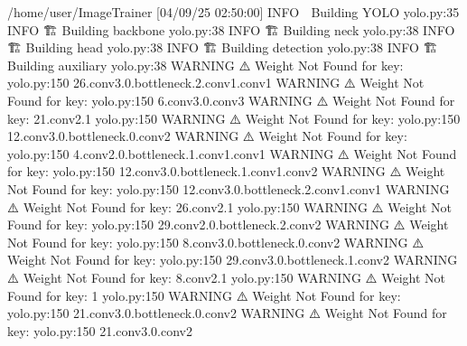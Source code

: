 /home/user/ImageTrainer
[04/09/25 02:50:00] INFO     🚜 Building YOLO                           yolo.py:35
                    INFO       🏗  Building backbone                     yolo.py:38
                    INFO       🏗  Building neck                         yolo.py:38
                    INFO       🏗  Building head                         yolo.py:38
                    INFO       🏗  Building detection                    yolo.py:38
                    INFO       🏗  Building auxiliary                    yolo.py:38
                    WARNING  ⚠ Weight Not Found for key:               yolo.py:150
                             26.conv3.0.bottleneck.2.conv1.conv1                  
                    WARNING  ⚠ Weight Not Found for key:               yolo.py:150
                             6.conv3.0.conv3                                      
                    WARNING  ⚠ Weight Not Found for key: 21.conv2.1    yolo.py:150
                    WARNING  ⚠ Weight Not Found for key:               yolo.py:150
                             12.conv3.0.bottleneck.0.conv2                        
                    WARNING  ⚠ Weight Not Found for key:               yolo.py:150
                             4.conv2.0.bottleneck.1.conv1.conv1                   
                    WARNING  ⚠ Weight Not Found for key:               yolo.py:150
                             12.conv3.0.bottleneck.1.conv1.conv2                  
                    WARNING  ⚠ Weight Not Found for key:               yolo.py:150
                             12.conv3.0.bottleneck.2.conv1.conv1                  
                    WARNING  ⚠ Weight Not Found for key: 26.conv2.1    yolo.py:150
                    WARNING  ⚠ Weight Not Found for key:               yolo.py:150
                             29.conv2.0.bottleneck.2.conv2                        
                    WARNING  ⚠ Weight Not Found for key:               yolo.py:150
                             8.conv3.0.bottleneck.0.conv2                         
                    WARNING  ⚠ Weight Not Found for key:               yolo.py:150
                             29.conv3.0.bottleneck.1.conv2                        
                    WARNING  ⚠ Weight Not Found for key: 8.conv2.1     yolo.py:150
                    WARNING  ⚠ Weight Not Found for key: 1             yolo.py:150
                    WARNING  ⚠ Weight Not Found for key:               yolo.py:150
                             21.conv3.0.bottleneck.0.conv2                        
                    WARNING  ⚠ Weight Not Found for key:               yolo.py:150
                             21.conv3.0.conv2                                     

